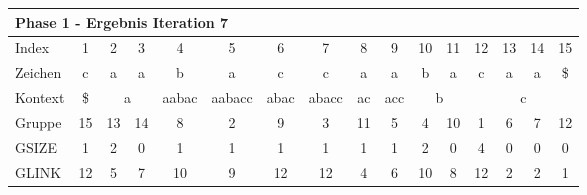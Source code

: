 \begin{table}[H]
\centering
\begin{adjustbox}{max width=\textwidth}
\begin{tabular}{lccccccccccccccc}
\multicolumn{16}{l}{Phase 1 - Ergebnis Iteration 7}                                                                                                                                                                                                                                                                                                    \\ \hline
\multicolumn{1}{l|}{Index}   & 1                       & 2                         & 3                       & 4                          & \cellcolor[HTML]{\green}5   & 6                         & 7                          & 8                       & 9                        & 10 & 11                      & 12  & 13  & 14  & 15  \\
\multicolumn{1}{l|}{Zeichen} & c                       & a                         & a                       & b                          & a                           & c                         & c                          & a                       & a                        & b  & a                       & c   & a   & a   & \$  \\ \cline{1-16}
\multicolumn{1}{l|}{Kontext} & \multicolumn{1}{c|}{\$} & \multicolumn{2}{c|}{a}                              & \multicolumn{1}{c|}{aabac} & \multicolumn{1}{c|}{aabacc} & \multicolumn{1}{c|}{abac} & \multicolumn{1}{c|}{abacc} & \multicolumn{1}{c|}{ac} & \multicolumn{1}{c|}{acc} & \multicolumn{2}{c|}{b}       & \multicolumn{4}{c}{c} \\
\multicolumn{1}{l|}{Gruppe}      & \multicolumn{1}{c|}{15} & 13                        & \multicolumn{1}{c|}{14} & \multicolumn{1}{c|}{8}     & \multicolumn{1}{c|}{2}      & \multicolumn{1}{c|}{9}    & \multicolumn{1}{c|}{3}     & \multicolumn{1}{c|}{11} & \multicolumn{1}{c|}{5}   & 4  & \multicolumn{1}{c|}{10} & 1   & 6   & 7   & 12  \\
\multicolumn{1}{l|}{GSIZE}   & \multicolumn{1}{c|}{1}  & 2                         & \multicolumn{1}{c|}{0}  & \multicolumn{1}{c|}{1}     & \multicolumn{1}{c|}{1}      & \multicolumn{1}{c|}{1}    & \multicolumn{1}{c|}{1}     & \multicolumn{1}{c|}{1}  & \multicolumn{1}{c|}{1}   & 2  & \multicolumn{1}{c|}{0}  & 4   & 0   & 0   & 0   \\
\multicolumn{1}{l|}{GLINK}   & 12                      & 5                         & 7                       & 10                         & 9                           & 12                        & 12                         & 4                       & 6                        & 10 & 8                       & 12  & 2   & 2   & 1   \\

\end{tabular}
\end{adjustbox}
\end{table}
